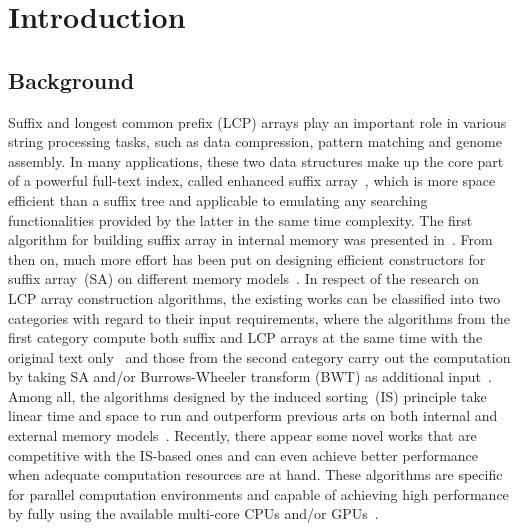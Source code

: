 \documentclass[10pt,journal,compsoc]{IEEEtran}
\begin{document}
\IEEEpeerreviewmaketitle

\section{Introduction}\label{sec:introduction}

\subsection{Background} \label{sec:introduction:background}


Suffix and longest common prefix (LCP) arrays play an important role in various string processing tasks, such as data compression, pattern matching and genome assembly. In many applications, these two data structures make up the core part of a powerful full-text index, called enhanced suffix array~\cite{Abouelhodaa2004}, which is more space efficient than a suffix tree and applicable to emulating any searching functionalities provided by the latter in the same time complexity. The first algorithm for building suffix array in internal memory was presented in~\cite{Manber1993}. From then on, much more effort has been put on designing efficient constructors for suffix array~(SA) on different memory models~\cite{Karkkainen2003, Ko2003, Kim2003, Nong11, Dementiev2008, Ferragina2012, Manzini2004, Bingmann12, Karkkainen2014, Nong14, Nong15}. In respect of the research on LCP array construction algorithms, the existing works can be classified into two categories with regard to their input requirements, where the algorithms from the first category compute both suffix and LCP arrays at the same time with the original text only~\cite{Fischer11, Bingmann12, Flick2015} and those from the second category carry out the computation by taking SA and/or Burrows-Wheeler transform (BWT) as additional input~\cite{Kasai2001,Karkkainen2009, Fischer11, Puglisi2008, Deo2013}. Among all, the algorithms designed by the induced sorting~(IS) principle take linear time and space to run and outperform previous arts on both internal and external memory models~\cite{Nong11, Karkkainen2014}. Recently, there appear some novel works that are competitive with the IS-based ones and can even achieve better performance when adequate computation resources are at hand. These algorithms are specific for parallel computation environments and capable of achieving high performance by fully using the available multi-core CPUs and/or GPUs~\cite{Osipov2012, Deo2013, Wang2015, Karkkainen2015, Karkkainen2016}. 
\end{document}
